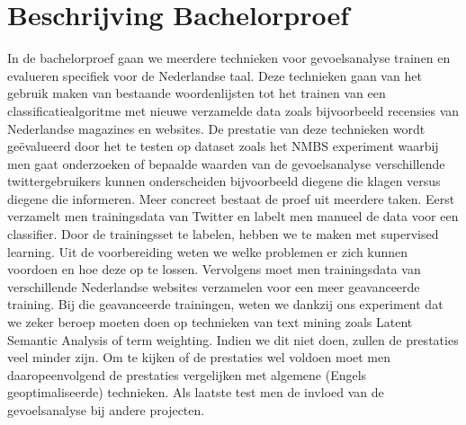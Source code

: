 \chapter{Beschrijving Bachelorproef}\label{Beschrijving Bachelorproef}

In de bachelorproef gaan we meerdere technieken voor gevoelsanalyse trainen en evalueren specifiek voor de Nederlandse taal. Deze technieken gaan van het gebruik maken van bestaande woordenlijsten tot het trainen van een classificatiealgoritme met nieuwe verzamelde data zoals bijvoorbeeld recensies van Nederlandse magazines en websites. De prestatie van deze technieken wordt ge\"evalueerd door het te testen op dataset zoals het NMBS experiment waarbij men gaat onderzoeken of bepaalde waarden van de gevoelsanalyse verschillende twittergebruikers kunnen onderscheiden bijvoorbeeld diegene die klagen versus diegene die informeren. Meer concreet bestaat de proef uit meerdere taken. Eerst verzamelt men trainingsdata van Twitter en labelt men manueel de data voor een classifier. Door de trainingsset te labelen, hebben we te maken met supervised learning. Uit de voorbereiding weten we welke problemen er zich kunnen voordoen en hoe deze op te lossen. Vervolgens moet men trainingsdata van verschillende Nederlandse websites verzamelen voor een meer geavanceerde training. Bij die geavanceerde trainingen, weten we dankzij ons experiment dat we zeker beroep moeten doen op technieken van text mining zoals Latent Semantic Analysis of term weighting. Indien we dit niet doen, zullen de prestaties veel minder zijn. Om te kijken of de prestaties wel voldoen moet men daaropeenvolgend de prestaties vergelijken met algemene (Engels geoptimaliseerde) technieken. Als laatste test men de invloed van de gevoelsanalyse bij andere projecten. 
    
